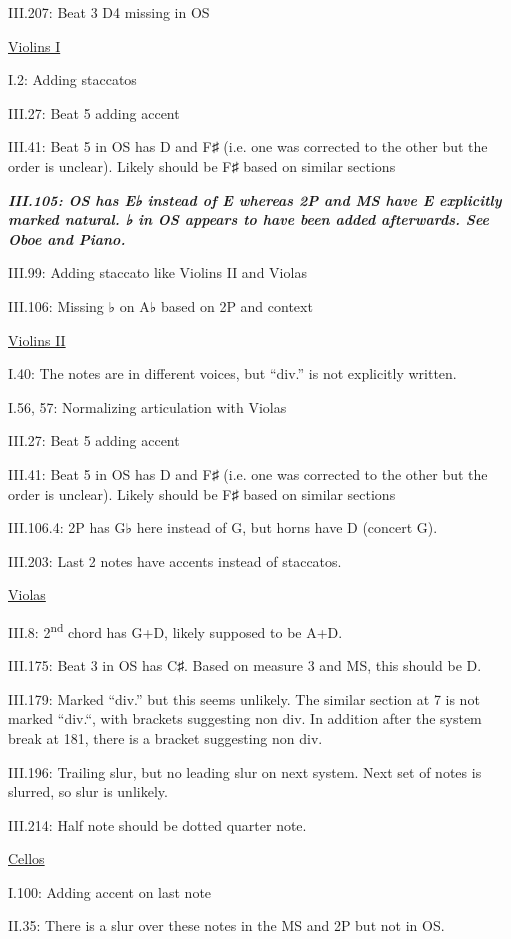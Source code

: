 \documentclass[twoside]{article}
\begin{document}
\begin{hangparas}{15pt}{1}
\begin{multicols}{2}
III.207: Beat 3 D4 missing in OS

\underline{Violins I}

I.2: Adding staccatos

III.27: Beat 5 adding accent

III.41: Beat 5 in OS has D and F♯ (i.e. one was corrected to the other but the order is unclear). Likely should be F♯ based on similar sections

\textbf{\textit{III.105: OS has E♭ instead of E whereas 2P and MS have E explicitly marked natural. ♭ in OS appears to have been added afterwards. See Oboe and Piano.}}

III.99: Adding staccato like Violins II and Violas

III.106: Missing ♭ on A♭ based on 2P and context

\underline{Violins II}

I.40: The notes are in different voices, but ``div.'' is not explicitly written.

I.56, 57: Normalizing articulation with Violas

III.27: Beat 5 adding accent

III.41: Beat 5 in OS has D and F♯ (i.e. one was corrected to the other but the order is unclear). Likely should be F♯ based on similar sections

III.106.4: 2P has G♭ here instead of G, but horns have D (concert G).

III.203: Last 2 notes have accents instead of staccatos.

\underline{Violas}

III.8: 2\textsuperscript{nd} chord has G+D, likely supposed to be A+D.

III.175: Beat 3 in OS has C♯. Based on measure 3 and MS, this should be D.

III.179: Marked ``div.'' but this seems unlikely. The similar section at 7 is not marked ``div.``, with brackets suggesting non div. In addition after the system break at 181, there is a bracket suggesting non div.

III.196: Trailing slur, but no leading slur on next system. Next set of notes is slurred, so slur is unlikely.

III.214: Half note should be dotted quarter note.

\underline{Cellos}

I.100: Adding accent on last note

II.35: There is a slur over these notes in the MS and 2P but not in OS.


\end{multicols}
\end{hangparas}
\end{document}
